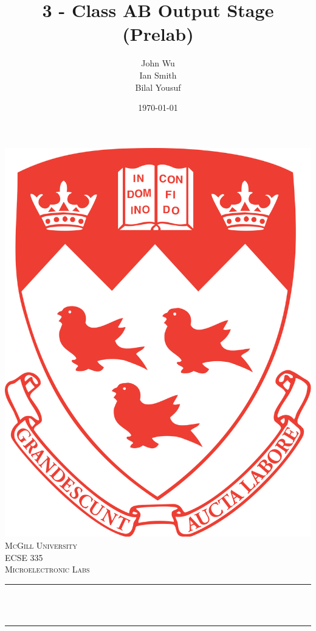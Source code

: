 \documentclass[12pt]{article}
\title{3 - Class AB Output Stage (Prelab)}                             %
\author{John Wu \\ Ian Smith \\ Bilal Yousuf}                               %
\date{\today}                                                           %
\makeatletter
\let\thetitle\@title
\makeatother
\begin{document}

\begin{titlepage}
    \centering
    \vspace*{0.5 cm}
    \includegraphics[scale = 0.07]{mcgill-logo.png}\\[1.0 cm]   %
    \textsc{\LARGE McGill University}\\[1.0 cm]   %
    \textsc{\Large ECSE 335}\\[0.5 cm]               %
    \textsc{\large Microelectronic Labs}\\[0.5 cm]               %
    \rule{\linewidth}{0.2 mm} \\[0.4 cm]
    { \huge \bfseries \thetitle}\\
    \rule{\linewidth}{0.2 mm} \\[1.5 cm]
    \begin{minipage}{0.4\textwidth}
        \begin{flushleft} \large

\end{flushleft}
\end{minipage}
\end{titlepage}
\end{document}

